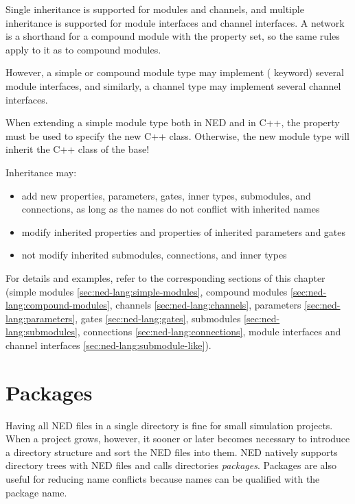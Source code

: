 Single inheritance is supported for modules and channels, and multiple
inheritance is supported for module interfaces and channel interfaces. A network
is a shorthand for a compound module with the  property set,
so the same rules apply to it as to compound modules.

However, a simple or compound module type may implement (
keyword) several module interfaces, and similarly, a channel type may implement
several channel interfaces.

\begin{important}
    When extending a simple module type both in NED and in C++, the
     property must be used to specify the new C++ class.
    Otherwise, the new module type will inherit the C++ class of the base!
\end{important}

Inheritance may:
\begin{itemize}
  \item add new properties, parameters, gates, inner types, submodules, and
    connections, as long as the names do not conflict with inherited names
  \item modify inherited properties and properties of inherited parameters and gates
  \item not modify inherited submodules, connections, and inner types
\end{itemize}

For details and examples, refer to the corresponding sections of this chapter
(simple modules \ref{sec:ned-lang:simple-modules}, compound modules
\ref{sec:ned-lang:compound-modules}, channels \ref{sec:ned-lang:channels},
parameters \ref{sec:ned-lang:parameters}, gates \ref{sec:ned-lang:gates},
submodules \ref{sec:ned-lang:submodules}, connections
\ref{sec:ned-lang:connections}, module interfaces and channel interfaces
\ref{sec:ned-lang:submodule-like}).



\section{Packages}
\label{sec:ned-lang:packages}

Having all NED files in a single directory is fine for small simulation
projects. When a project grows, however, it sooner or later becomes necessary to
introduce a directory structure and sort the NED files into them. NED natively
supports directory trees with NED files and calls directories \textit{packages}.
Packages are also useful for reducing name conflicts because names can be
qualified with the package name.

